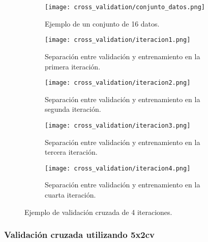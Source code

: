\begin{figure}[H]
    \centering

	 \begin{subfigure}[b]{\textwidth}
		\centering
		\texttt{[image: cross\_validation/conjunto\_datos.png]}
		\caption{Ejemplo de un conjunto de 16 datos.}
	  \label{fig:ej_16_datos}
   \end{subfigure}
	\vspace{1cm}

	 \begin{subfigure}[b]{\textwidth}
		 \centering
		 \texttt{[image: cross\_validation/iteracion1.png]}
 		 \caption{Separación entre validación y entrenamiento en la primera iteración.}
 	    \label{fig:cv_iteracion1}
	 \end{subfigure}
	 \vspace{1cm}

	\begin{subfigure}[b]{\textwidth}
		 \centering
		 \texttt{[image: cross\_validation/iteracion2.png]}
 		 \caption{Separación entre validación y entrenamiento en la segunda iteración.}
 	    \label{fig:cv_iteracion2}
   \end{subfigure}
	\vspace{1cm}

	\begin{subfigure}[b]{\textwidth}
		 \centering
		 \texttt{[image: cross\_validation/iteracion3.png]}
 		 \caption{Separación entre validación y entrenamiento en la tercera iteración.}
 	    \label{fig:cv_iteracion3}
	\end{subfigure}
	\vspace{1cm}

	\begin{subfigure}[b]{\textwidth}
		 \centering
		 \texttt{[image: cross\_validation/iteracion4.png]}
 		 \caption{Separación entre validación y entrenamiento en la cuarta iteración.}
 	    \label{fig:cv_iteracion4}
	\end{subfigure}

	\caption{Ejemplo de validación cruzada de 4 iteraciones.}
	\label{fig:4-cv-ejemplo}
\end{figure}


\subsubsection{Validación cruzada utilizando 5x2cv}

